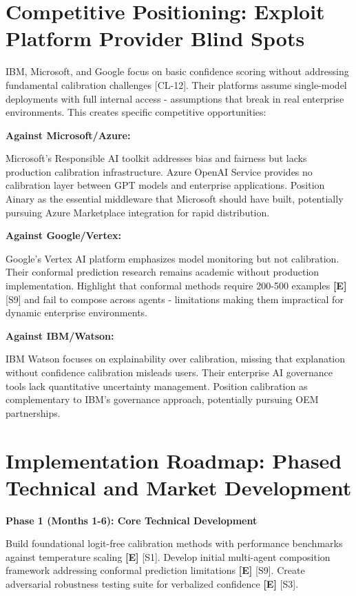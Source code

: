 \documentclass[a4paper,11pt]{article}
\newcommand{\elabel}{\textbf{\textcolor{ecolor}{[E]}}}
\begin{document}
\section{Competitive Positioning: Exploit Platform Provider Blind Spots}

IBM, Microsoft, and Google focus on basic confidence scoring without addressing fundamental calibration challenges [CL-12]. Their platforms assume single-model deployments with full internal access - assumptions that break in real enterprise environments. This creates specific competitive opportunities:


\textbf{Against Microsoft/Azure:}\par
Microsoft's Responsible AI toolkit addresses bias and fairness but lacks production calibration infrastructure. Azure OpenAI Service provides no calibration layer between GPT models and enterprise applications. Position Ainary as the essential middleware that Microsoft should have built, potentially pursuing Azure Marketplace integration for rapid distribution.


\textbf{Against Google/Vertex:}\par
Google's Vertex AI platform emphasizes model monitoring but not calibration. Their conformal prediction research remains academic without production implementation. Highlight that conformal methods require 200-500 examples \elabel{} \textcolor{primary}{[S9]} and fail to compose across agents - limitations making them impractical for dynamic enterprise environments.


\textbf{Against IBM/Watson:}\par
IBM Watson focuses on explainability over calibration, missing that explanation without confidence calibration misleads users. Their enterprise AI governance tools lack quantitative uncertainty management. Position calibration as complementary to IBM's governance approach, potentially pursuing OEM partnerships.


\section{Implementation Roadmap: Phased Technical and Market Development}

\textbf{Phase 1 (Months 1-6): Core Technical Development}\par
Build foundational logit-free calibration methods with performance benchmarks against temperature scaling \elabel{} \textcolor{primary}{[S1]}. Develop initial multi-agent composition framework addressing conformal prediction limitations \elabel{} \textcolor{primary}{[S9]}. Create adversarial robustness testing suite for verbalized confidence \elabel{} \textcolor{primary}{[S3]}.
\end{document}
